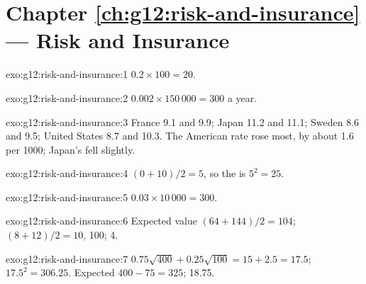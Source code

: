 \section*{Chapter \ref{ch:g12:risk-and-insurance} --- Risk and Insurance}

\begin{solution}{exo:g12:risk-and-insurance:1}
$0.2 \times 100 = 20$.
\end{solution}

\begin{solution}{exo:g12:risk-and-insurance:2}
$0.002 \times 150\,000 = 300$ a year.
\end{solution}

\begin{solution}{exo:g12:risk-and-insurance:3}
France 9.1 and 9.9; Japan 11.2 and 11.1; Sweden 8.6 and 9.5; United States 8.7 and 10.3. The American rate rose most, by about 1.6 per 1000; Japan's fell slightly.
\end{solution}

\begin{solution}{exo:g12:risk-and-insurance:4}
 $(0 + 10)/2 = 5$, so the  is $5^2 = 25$.
\end{solution}

\begin{solution}{exo:g12:risk-and-insurance:5}
$0.03 \times 10\,000 = 300$.
\end{solution}

\begin{solution}{exo:g12:risk-and-insurance:6}
Expected value $(64 + 144)/2 = 104$;  $(8 + 12)/2 = 10$,  100;  4.
\end{solution}

\begin{solution}{exo:g12:risk-and-insurance:7}
 $0.75\sqrt{400} + 0.25\sqrt{100} = 15 + 2.5 = 17.5$;  $17.5^2 = 306.25$. Expected  $400 - 75 = 325$;  18.75.
\end{solution}

